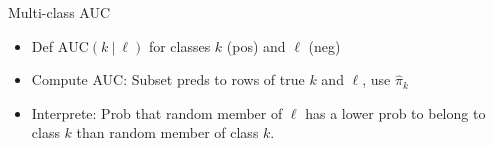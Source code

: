 \documentclass[11pt,compress,t,notes=noshow, xcolor=table]{beamer}
\begin{document}


\begin{vbframe}{Multi-class AUC}

\begin{itemize}

\item Def $\text{AUC}(k ~|~ \ell)$ for classes $k$ (pos) and $\ell$ (neg)

\item Compute AUC: Subset preds to rows of true $k$ and $\ell$, use $\hat \pi_k$ 

\item Interprete: Prob that random member of $\ell$ has a lower prob to belong to class $k$ than random member of class $k$.

\end{itemize}

\lz


\end{vbframe}
\end{document}
